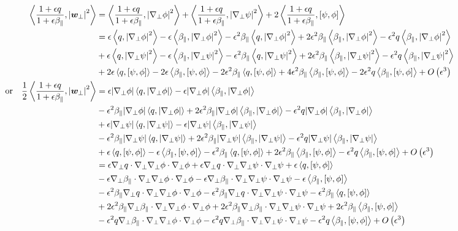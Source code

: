 \documentclass{article}
\newcommand{\para}{\parallel}
\newcommand{\ep}{\epsilon}
\newcommand{\np}{\nabla_\perp}
\newcommand{\fr}{\frac{1+\ep q}{1+\ep\beta_\para}}
\newcommand{\pth} [1] {\left( #1 \right) }
\newcommand{\br} [1] {\left[ #1 \right] }
\begin{document}
\begin{align}
    \Braket{\fr, \left| \bm{w}_\perp \right|^2} &= \Braket{\fr, \left|\np\phi\right|^2} + \Braket{\fr, \left|\np\psi\right|^2} + 2\Braket{\fr, \br{\psi,\phi}} \\ 
        &= \ep\Braket{q, \left|\np\phi\right|^2} - \ep\Braket{\beta_\para, \left|\np\phi\right|^2} - \ep^2\beta_\para\Braket{q, \left|\np\phi\right|^2} + 2\ep^2\beta_\para\Braket{\beta_\para, \left|\np\phi\right|^2} - \ep^2q\Braket{\beta_\para, \left|\np\phi\right|^2} \\ 
        &+ \ep\Braket{q, \left|\np\psi\right|^2} - \ep\Braket{\beta_\para, \left|\np\psi\right|^2} - \ep^2\beta_\para\Braket{q, \left|\np\psi\right|^2} + 2\ep^2\beta_\para\Braket{\beta_\para, \left|\np\psi\right|^2} - \ep^2q\Braket{\beta_\para, \left|\np\psi\right|^2} \\ 
        &+ 2\ep\Braket{q, \br{\psi,\phi}} - 2\ep\Braket{\beta_\para, \br{\psi,\phi}} - 2\ep^2\beta_\para\Braket{q, \br{\psi,\phi}} + 4\ep^2\beta_\para\Braket{\beta_\para, \br{\psi,\phi}} - 2\ep^2q\Braket{\beta_\para, \br{\psi,\phi}} + O\pth{\ep^3} \\ 
    \text{or}\quad \frac{1}{2} \Braket{\fr, \left| \bm{w}_\perp \right|^2} 
        &= \ep|\np\phi| \Braket{q, \left|\np\phi\right|} - \ep|\np\phi| \Braket{\beta_\para, \left|\np\phi\right|} \\ 
            &- \ep^2\beta_\para|\np\phi| \Braket{q, \left|\np\phi\right|} + 2\ep^2\beta_\para|\np\phi| \Braket{\beta_\para, \left|\np\phi\right|} - \ep^2q|\np\phi| \Braket{\beta_\para, \left|\np\phi\right|} \\ 
        &+ \ep|\np\psi| \Braket{q, \left|\np\psi\right|} - \ep|\np\psi| \Braket{\beta_\para, \left|\np\psi\right|} \\ 
            &- \ep^2\beta_\para|\np\psi| \Braket{q, \left|\np\psi\right|} + 2\ep^2\beta_\para|\np\psi| \Braket{\beta_\para, \left|\np\psi\right|} - \ep^2q|\np\psi| \Braket{\beta_\para, \left|\np\psi\right|} \\ 
        &+ \ep\Braket{q, \br{\psi,\phi}} - \ep\Braket{\beta_\para, \br{\psi,\phi}} - \ep^2\beta_\para\Braket{q, \br{\psi,\phi}} + 2\ep^2\beta_\para\Braket{\beta_\para, \br{\psi,\phi}} - \ep^2q\Braket{\beta_\para, \br{\psi,\phi}} + O\pth{\ep^3} \\ 
        &= \ep\np q\cdot\np\np\phi\cdot\np\phi + \ep\np q\cdot\np\np\psi\cdot\np\psi + \ep\Braket{q, \br{\psi,\phi}} \\ 
        &- \ep\np \beta_\para \cdot\np\np\phi\cdot\np\phi - \ep\np \beta_\para \cdot\np\np\psi\cdot\np\psi - \ep\Braket{\beta_\para, \br{\psi,\phi}} \\ 
        &- \ep^2\beta_\para\np q\cdot\np\np\phi\cdot\np\phi - \ep^2\beta_\para\np q\cdot\np\np\psi\cdot\np\psi - \ep^2\beta_\para\Braket{q, \br{\psi,\phi}} \\ 
        &+ 2\ep^2\beta_\para\np \beta_\para\cdot\np\np\phi\cdot\np\phi + 2\ep^2\beta_\para\np \beta_\para\cdot\np\np\psi\cdot\np\psi + 2\ep^2\beta_\para\Braket{\beta_\para, \br{\psi,\phi}} \\ 
        &- \ep^2q\np \beta_\para\cdot\np\np\phi\cdot\np\phi - \ep^2q\np \beta_\para\cdot\np\np\psi\cdot\np\psi - \ep^2q\Braket{\beta_\para, \br{\psi,\phi}} + O\pth{\ep^3} 
\end{align}
\end{document}
